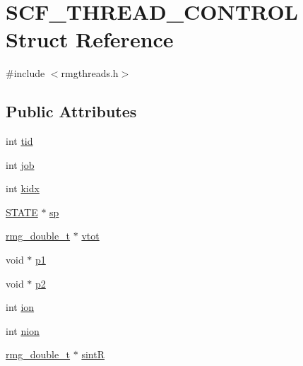\hypertarget{struct_s_c_f___t_h_r_e_a_d___c_o_n_t_r_o_l}{\section{S\-C\-F\-\_\-\-T\-H\-R\-E\-A\-D\-\_\-\-C\-O\-N\-T\-R\-O\-L Struct Reference}
\label{struct_s_c_f___t_h_r_e_a_d___c_o_n_t_r_o_l}
}


{\ttfamily \#include $<$rmgthreads.\-h$>$}

\subsection*{Public Attributes}
\begin{DoxyCompactItemize}
\item 
int \hyperlink{struct_s_c_f___t_h_r_e_a_d___c_o_n_t_r_o_l_ab4f2e8217f11d938c4b7473d57f3d636}{tid}
\item 
int \hyperlink{struct_s_c_f___t_h_r_e_a_d___c_o_n_t_r_o_l_afa5fe5e6ee5ba9a5b290c24f58232cb2}{job}
\item 
int \hyperlink{struct_s_c_f___t_h_r_e_a_d___c_o_n_t_r_o_l_a84f3e0d0a5aea76282791785c1b3ca09}{kidx}
\item 
\hyperlink{struct_s_t_a_t_e}{S\-T\-A\-T\-E} $\ast$ \hyperlink{struct_s_c_f___t_h_r_e_a_d___c_o_n_t_r_o_l_a379ef8a6965369f82e7db4818f673e06}{sp}
\item 
\hyperlink{rmgtypes_8h_aaa16921c14f121c56eaa42390a340db8}{rmg\-\_\-double\-\_\-t} $\ast$ \hyperlink{struct_s_c_f___t_h_r_e_a_d___c_o_n_t_r_o_l_a64c189cc375616ee8f3de29339aca47b}{vtot}
\item 
void $\ast$ \hyperlink{struct_s_c_f___t_h_r_e_a_d___c_o_n_t_r_o_l_a67f50f21ac0604142300f5c6834dbfcc}{p1}
\item 
void $\ast$ \hyperlink{struct_s_c_f___t_h_r_e_a_d___c_o_n_t_r_o_l_a3b095907250f8b0e02305eadc0f39bf3}{p2}
\item 
int \hyperlink{struct_s_c_f___t_h_r_e_a_d___c_o_n_t_r_o_l_ab070dfef848f138047aeeb20182a25a6}{ion}
\item 
int \hyperlink{struct_s_c_f___t_h_r_e_a_d___c_o_n_t_r_o_l_adacf6a8e2693da61391e17ef5473bd98}{nion}
\item 
\hyperlink{rmgtypes_8h_aaa16921c14f121c56eaa42390a340db8}{rmg\-\_\-double\-\_\-t} $\ast$ \hyperlink{struct_s_c_f___t_h_r_e_a_d___c_o_n_t_r_o_l_af6d6fef40616fa3fd033a8c97df09f0c}{sint\-R}
\item 

\end{DoxyCompactItemize}
